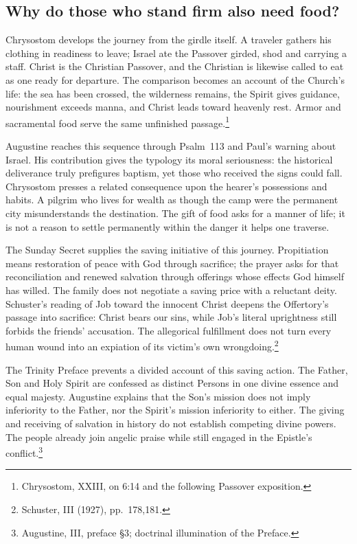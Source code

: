 \subsection{Why do those who stand firm also need food?}
Chrysostom develops the journey from the girdle itself. A traveler gathers his clothing in readiness to leave; Israel ate the Passover girded, shod and carrying a staff. Christ is the Christian Passover, and the Christian is likewise called to eat as one ready for departure. The comparison becomes an account of the Church's life: the sea has been crossed, the wilderness remains, the Spirit gives guidance, nourishment exceeds manna, and Christ leads toward heavenly rest. Armor and sacramental food serve the same unfinished passage.\footnote{Chrysostom,  XXIII, on 6:14 and the following Passover exposition.}

Augustine reaches this sequence through Psalm~113 and Paul's warning about Israel. His contribution gives the typology its moral seriousness: the historical deliverance truly prefigures baptism, yet those who received the signs could fall. Chrysostom presses a related consequence upon the hearer's possessions and habits. A pilgrim who lives for wealth as though the camp were the permanent city misunderstands the destination. The gift of food asks for a manner of life; it is not a reason to settle permanently within the danger it helps one traverse.

The Sunday Secret supplies the saving initiative of this journey. Propitiation means restoration of peace with God through sacrifice; the prayer asks for that reconciliation and renewed salvation through offerings whose effects God himself has willed. The family does not negotiate a saving price with a reluctant deity. Schuster's reading of Job toward the innocent Christ deepens the Offertory's passage into sacrifice: Christ bears our sins, while Job's literal uprightness still forbids the friends' accusation. The allegorical fulfillment does not turn every human wound into an expiation of its victim's own wrongdoing.\footnote{Schuster,  III (1927), pp.~178,181.}

The Trinity Preface prevents a divided account of this saving action. The Father, Son and Holy Spirit are confessed as distinct Persons in one divine essence and equal majesty. Augustine explains that the Son's mission does not imply inferiority to the Father, nor the Spirit's mission inferiority to either. The giving and receiving of salvation in history do not establish competing divine powers. The people already join angelic praise while still engaged in the Epistle's conflict.\footnote{Augustine,  III, preface \S3; doctrinal illumination of the Preface.}

